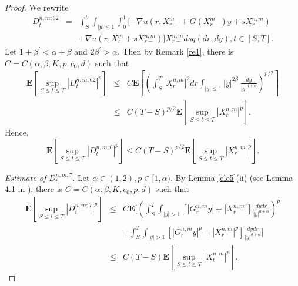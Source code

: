 \documentclass[11pt]{amsart}
\theoremstyle{plain}
\numberwithin{equation}{section}
\begin{document}
\begin{proof}
We rewrite 
\begin{eqnarray*}
D_{t}^{n,m;62} &=&\int_{S}^{t}\int_{\left\vert y\right\vert \leq
1}\int_{0}^{1}[-\nabla u\left( r,X_{r-}^{m}+G\left( X_{r-}^{m}\right)
y+sX_{r-}^{n,m}\right) \\
&&+\nabla u\left( r,X_{r}^{m}+sX_{r-}^{n,m}\right) ]X_{r-}^{n,m}dsq\left(
dr,dy\right) ,t\in \left[ S,T\right] .
\end{eqnarray*}Let $1+\beta ^{\prime }<\alpha +\beta $ and $2\beta ^{\prime }>\alpha $.
Then by Remark \ref{re1}, there is $C=C\left( \alpha ,\beta
,K,p,c_{0},d\right) $ such that 
\begin{eqnarray*}
\mathbf{E}\left[ \sup_{S\leq t\leq T}\left\vert D_{t}^{n,m;62}\right\vert
^{p}\right] &\leq &C\mathbf{E}\left[ \left( \int_{S}^{T}\left\vert
X_{r}^{n,m}\right\vert ^{2}dr\int_{\left\vert y\right\vert \leq 1}\left\vert
y\right\vert ^{2\beta ^{\prime }}\frac{dy}{\left\vert y\right\vert
^{d+\alpha }}\right) ^{p/2}\right] \\
&\leq &C\left( T-S\right) ^{p/2}\mathbf{E}\left[ \sup_{S\leq t\leq
T}\left\vert X_{r}^{n,m}\right\vert ^{p}\right] .
\end{eqnarray*}Hence, 
\begin{equation*}
\mathbf{E}\left[ \sup_{S\leq t\leq T}\left\vert D_{t}^{n,m;6}\right\vert ^{p}\right] \leq C\left( T-S\right) ^{p/2}\mathbf{E}\left[ \sup_{S\leq t\leq
T}\left\vert X_{r}^{n,m}\right\vert ^{p}\right] .
\end{equation*}

\emph{Estimate of }$D_{t}^{n,m;7}$. Let $\alpha \in \left( 1,2\right) ,p\in
\lbrack 1,\alpha )$. By Lemma \ref{ele5}(ii) (see Lemma 4.1 in \cite{lm}),
there is $C=C\left( \alpha ,\beta ,K,c_{0},p,d\right) $ such that 
\begin{eqnarray*}
\mathbf{E}\left[ \sup_{S\leq t\leq T}\left\vert D_{t}^{n,m;7}\right\vert ^{p}\right] &\leq &C\mathbf{E}\Big[\left( \int_{S}^{T}\int_{\left\vert
y\right\vert >1}[\left\vert G_{r}^{n,m}y\right\vert +\left\vert
X_{r}^{n,m}\right\vert ]\frac{dydr}{\left\vert y\right\vert ^{d+\alpha }}\right) ^{p} \\
&&+\int_{S}^{T}\int_{\left\vert y\right\vert >1}[\left\vert
G_{r}^{n,m}y\right\vert ^{p}+\left\vert X_{r}^{n,m}\right\vert ^{p}]\frac{dydr}{\left\vert y\right\vert ^{d+\alpha }}\Big] \\
&\leq &C\left( T-S\right) \mathbf{E}\left[ \sup_{S\leq t\leq T}\left\vert
X_{t}^{n,m}\right\vert ^{p}\right] .
\end{eqnarray*}


\end{proof}
\end{document}

